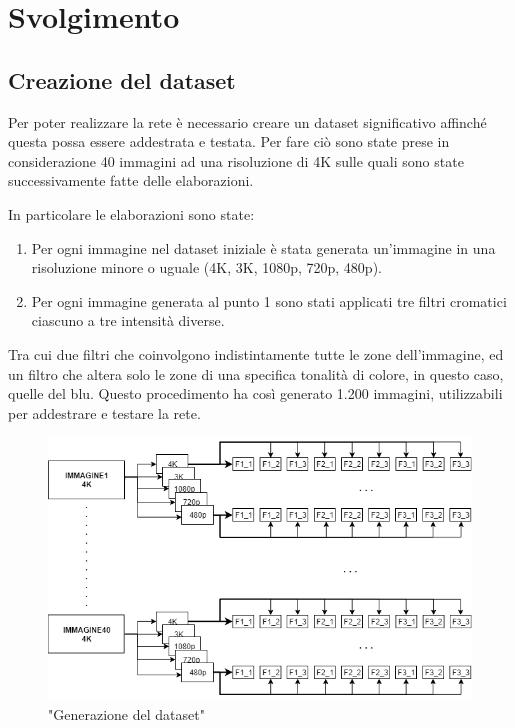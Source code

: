 \documentclass[a4paper,11pt]{article}
\begin{document}
  
    \newpage

    \section{Svolgimento}

    \subsection{Creazione del dataset}
    Per poter realizzare la rete è necessario creare un dataset significativo affinché questa possa essere addestrata e testata. 
    Per fare ciò sono state prese in considerazione 40 immagini ad una risoluzione di 4K sulle quali sono state successivamente fatte delle elaborazioni.

    In particolare le elaborazioni sono state:
    \begin{enumerate}
        \item Per ogni immagine nel dataset iniziale è stata generata un'immagine in una risoluzione minore o uguale (4K, 3K, 1080p, 720p, 480p).
        \item Per ogni immagine generata al punto 1 sono stati applicati tre filtri cromatici ciascuno a tre intensità diverse.
    \end{enumerate}
    Tra cui due filtri che coinvolgono indistintamente tutte le zone dell'immagine, ed un filtro che altera solo le zone di una specifica tonalità di colore, in questo caso, quelle del blu.
    Questo procedimento ha così generato 1.200 immagini, utilizzabili per addestrare e testare la rete.
    
    \begin{figure}[h]
        \centering
        \includegraphics[scale=0.55]{generazione.png}
        \caption{"Generazione del dataset"}
    \end{figure}
    \newpage
\end{document}
